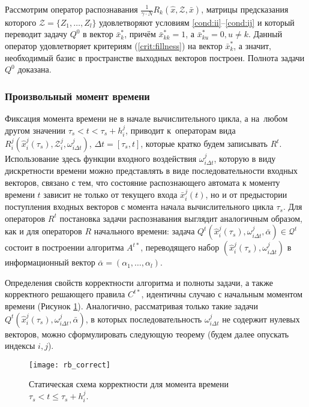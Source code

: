 \begin{Proof}
 Рассмотрим оператор распознавания $\frac{1}{\gamma\cdot N}R_k(\hat x,\mathcal Z,\bar x)$, матрицы предсказания которого $\mathcal Z=\{Z_1,\dots,Z_l\}$ удовлетворяют условиям \ref{cond:ii}--\ref{cond:ij} и который переводит задачу $Q^0$ в вектор $\bar x_k^*$, причём $\bar x_{kk}^*=1$, а $\bar x_{ku}^*=0, u\neq k$. Данный оператор удовлетворяет критериям (\ref{crit:fillness}) на вектор $\bar x_k^*$, а значит, необходимый базис в пространстве выходных векторов построен. Полнота задачи $Q^0$ доказана.
\end{Proof}

\subsubsection{Произвольный момент времени}
Фиксация момента времени не в начале вычислительного цикла, а на~любом другом значении $\tau_s<t<\tau_s+h_i^j$, приводит к~операторам вида $R_i^j(\hat x_i^j(\tau_s), \mathcal Z_i^j, \omega_{i\Delta t}^j)$, $\Delta t=[\tau_s, t]$, которые кратко будем записывать $R^t$. Использование здесь функции входного воздействия $\omega_{i\Delta t}^j$, которую в виду дискретности времени можно представлять в виде последовательности входных векторов, связано с тем, что состояние распознающего автомата к моменту времени $t$ зависит не только от текущего входа $\bar x_i^j(t)$, но и от предыстории поступления входных векторов с момента начала вычислительного цикла $\tau_s$. Для операторов $R^t$ постановка задачи распознавания выглядит аналогичным образом, как и для операторов $R$ начального времени: задача $Q^t(\hat x_i^j(\tau_s), \omega_{i\Delta t}^j, \bar\alpha)\in\mathcal Q^t$ состоит в построении алгоритма $A^{t*}$, переводящего набор $(\hat x_i^j(\tau_s), \omega_{i\Delta t}^j)$ в информационный вектор $\bar\alpha=(\alpha_1,\dots,\alpha_l)$. 

Определения свойств корректности алгоритма и полноты задачи, а также корректного решающего правила $C^{t*}$, идентичны случаю с начальным моментом времени (Рисунок \ref{fig:rb_correct_statt}). Аналогично, рассматривая только такие задачи $Q^t(\hat x_i^j(\tau_s), \omega_{i\Delta t}^j, \bar\alpha)$, в которых последовательность $\omega_{i\Delta t}^j$ не содержит нулевых векторов, можно сформулировать следующую теорему (будем далее опускать индексы $i,j$).
	
\begin{figure}[h]
	\centering
	\texttt{[image: rb\_correct]}
	\caption{Статическая схема корректности для момента времени $\tau_s<t\leqslant\tau_s+h_i^j$.}
	\label{fig:rb_correct_statt}
\end{figure}
	
